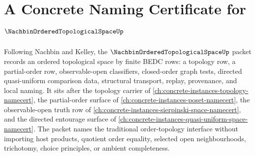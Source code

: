 \chapter{A Concrete Naming Certificate for $\NachbinOrderedTopologicalSpaceUp$}
\label{ch:concrete-instances-nachbin-ordered-topological-space-namecert}

Following Nachbin and Kelley, the $\NachbinOrderedTopologicalSpaceUp$ packet records an ordered topological space by finite BEDC rows: a topology row, a partial-order row, observable-open classifiers, closed-order graph tests, directed quasi-uniform comparison data, structural transport, replay, provenance, and local naming. It sits after the topology carrier of \autoref{ch:concrete-instances-topology-namecert}, the partial-order surface of \autoref{ch:concrete-instances-poset-namecert}, the observable-open truth row of \autoref{ch:concrete-instances-sierpinski-space-namecert}, and the directed entourage surface of \autoref{ch:concrete-instances-quasi-uniform-space-namecert}. The packet names the traditional order-topology interface without importing host products, quotient order equality, selected open neighbourhoods, trichotomy, choice principles, or ambient completeness.

